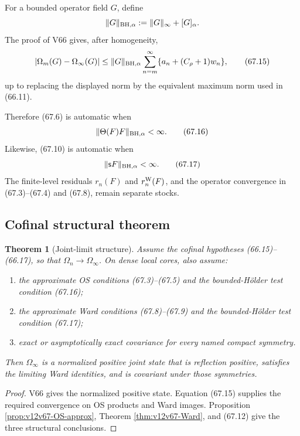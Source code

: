 \documentclass[11pt]{article}
\newtheorem{theorem}{Theorem}[section]
\theoremstyle{remark}
\begin{document}
For a bounded operator field \(G\), define
\[
 \|G\|_{{\rm BH},\alpha}
 :=
 \|G\|_\infty+[G]_\alpha.
\]
The proof of V66 gives, after homogeneity,
\begin{equation}
 |\Omega_m(G)-\Omega_\infty(G)|
 \leq
 \|G\|_{{\rm BH},\alpha}
 \sum_{n=m}^\infty
 \{a_n+(C_\rho+1)w_n\},                           \tag{67.15}
\end{equation}
up to replacing the displayed norm by the equivalent maximum norm
used in (66.11).

Therefore (67.6) is automatic when
\begin{equation}
 \|\Theta(F)F\|_{{\rm BH},\alpha}<\infty.          \tag{67.16}
\end{equation}
Likewise, (67.10) is automatic when
\begin{equation}
 \|{\mathsf s}F\|_{{\rm BH},\alpha}<\infty.        \tag{67.17}
\end{equation}
The finite-level residuals \(r_n(F)\) and
\(r_n^{\rm W}(F)\), and the operator convergence in
(67.3)--(67.4) and (67.8), remain separate stocks.

\subsection{Cofinal structural theorem}

\begin{theorem}[Joint-limit structure]
\label{thm:v12v67-joint-structure}
Assume the cofinal hypotheses (66.15)--(66.17), so that
\(\Omega_n\to\Omega_\infty\).  On dense local cores, also assume:
\begin{enumerate}
\item the approximate OS conditions (67.3)--(67.5) and the
bounded-Hölder test condition (67.16);
\item the approximate Ward conditions (67.8)--(67.9) and the
bounded-Hölder test condition (67.17);
\item exact or asymptotically exact covariance for every named
compact symmetry.
\end{enumerate}
Then \(\Omega_\infty\) is a normalized positive joint state that is
reflection positive, satisfies the limiting Ward identities, and is
covariant under those symmetries.
\end{theorem}

\begin{proof}
V66 gives the normalized positive state.  Equation (67.15) supplies
the required convergence on OS products and Ward images.
Proposition \ref{prop:v12v67-OS-approx}, Theorem
\ref{thm:v12v67-Ward}, and (67.12) give the three structural
conclusions.
\end{proof}
\end{document}
